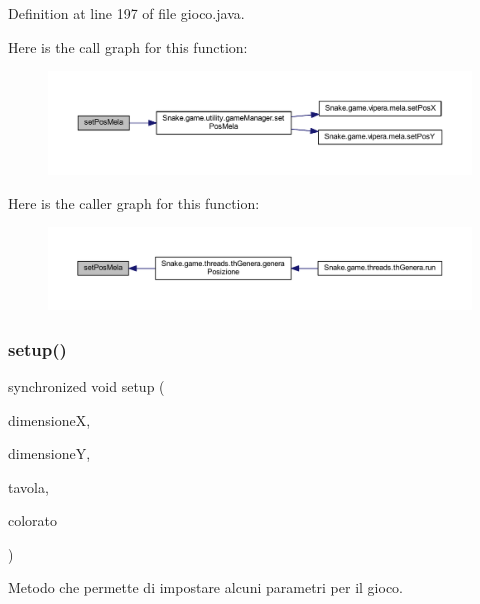 Definition at line 197 of file gioco.\+java.

Here is the call graph for this function\+:
\nopagebreak
\begin{figure}[H]
\begin{center}
\leavevmode
\includegraphics[width=350pt]{class_snake_1_1game_1_1gioco_a6fcd26707b59561887560c3c4696062b_cgraph}
\end{center}
\end{figure}
Here is the caller graph for this function\+:
\nopagebreak
\begin{figure}[H]
\begin{center}
\leavevmode
\includegraphics[width=350pt]{class_snake_1_1game_1_1gioco_a6fcd26707b59561887560c3c4696062b_icgraph}
\end{center}
\end{figure}
\mbox{\label{class_snake_1_1game_1_1gioco_a3b1654da86fa1fa7edeeb31ef7b6c7c8}} 
\subsubsection{\texorpdfstring{setup()}{setup()}}
{\footnotesize\ttfamily synchronized void setup (\begin{DoxyParamCaption}\item[{int}]{dimensioneX,  }\item[{int}]{dimensioneY,  }\item[{P\+Applet}]{tavola,  }\item[{boolean}]{colorato }\end{DoxyParamCaption})}



Metodo che permette di impostare alcuni parametri per il gioco. 


